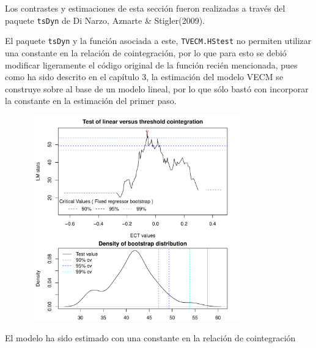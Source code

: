 \documentclass[12pt, twoside]{book}\usepackage[]{graphicx}\usepackage[]{color}
\newenvironment{knitrout}{}{} %
\numberwithin{equation}{section}
\numberwithin{theorem}{section}
\numberwithin{teorema}{section}
\numberwithin{defi}{section}
\numberwithin{prop}{section}
\numberwithin{defi}{section}
\theoremstyle{plain}
\begin{document}
Los contrastes y estimaciones de esta sección fueron realizadas a través del paquete \texttt{tsDyn} de Di Narzo, Aznarte \& Stigler(2009).

El paquete \texttt{tsDyn} y la función asociada a este, \texttt{TVECM.HStest} no permiten utilizar una constante en la relación de cointegración, por lo que para esto se debió modificar ligeramente el código original de la función recién mencionada, pues como ha sido descrito en el capítulo 3, la estimación del modelo VECM se construye sobre al base de un modelo lineal, por lo que sólo bastó con incorporar la constante en la estimación del primer paso. 

\begin{knitrout}
\color{fgcolor}

{\centering \includegraphics[width=4.5in,height=3.5in]{figure/unnamed-chunk-26-1} 

}



\end{knitrout}


El modelo ha sido estimado con una constante en la relación de cointegración
\end{document}
